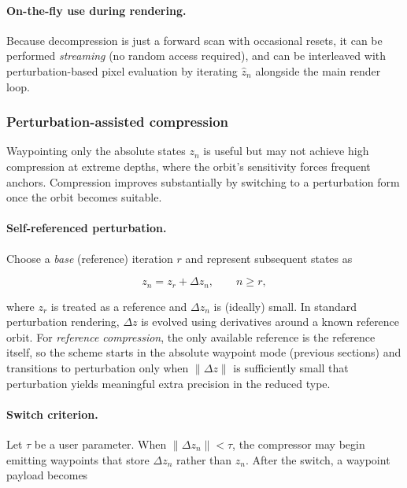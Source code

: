 \paragraph{On-the-fly use during rendering.}
Because decompression is just a forward scan with occasional resets, it can be
performed \emph{streaming} (no random access required), and can be interleaved
with perturbation-based pixel evaluation by iterating \(\hat z_n\) alongside the
main render loop.

\subsubsection{Perturbation-assisted compression}

\label{sec:refcomp-pert}
Waypointing only the absolute states \(z_n\) is useful but may not achieve high
compression at extreme depths, where the orbit's sensitivity forces frequent
anchors.  Compression improves substantially by switching to a perturbation form
once the orbit becomes suitable.

\paragraph{Self-referenced perturbation.}
Choose a \emph{base} (reference) iteration \(r\) and represent subsequent states as

\begin{equation}
  z_n = z_r + \Delta z_n, \qquad n \ge r,
  \label{eq:self-ref-perturbation}
\end{equation}

where \(z_r\) is treated as a reference and \(\Delta z_n\) is (ideally) small.
In standard perturbation rendering, \(\Delta z\) is evolved using derivatives
around a known reference orbit.  For \emph{reference compression}, the only
available reference is the reference itself, so the scheme starts in the
absolute waypoint mode (previous sections) and transitions to perturbation only
when \(\lVert \Delta z \rVert\) is sufficiently small that perturbation yields
meaningful extra precision in the reduced type.

\paragraph{Switch criterion.}
Let \(\tau\) be a user parameter.  When \(\lVert \Delta z_n \rVert < \tau\), the
compressor may begin emitting waypoints that store \(\Delta z_n\) rather than
\(z_n\).  After the switch, a waypoint payload becomes

